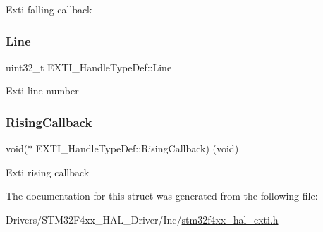 Exti falling callback \mbox{\label{struct_e_x_t_i___handle_type_def_a6a2875051ad4276be5322ffa99e12566}} 
\subsubsection{\texorpdfstring{Line}{Line}}
{\footnotesize\ttfamily uint32\+\_\+t E\+X\+T\+I\+\_\+\+Handle\+Type\+Def\+::\+Line}

Exti line number \mbox{\label{struct_e_x_t_i___handle_type_def_a9d74e688439641a4d68d2730a61b149f}} 
\subsubsection{\texorpdfstring{Rising\+Callback}{RisingCallback}}
{\footnotesize\ttfamily void($\ast$  E\+X\+T\+I\+\_\+\+Handle\+Type\+Def\+::\+Rising\+Callback) (void)}

Exti rising callback 

The documentation for this struct was generated from the following file\+:\begin{DoxyCompactItemize}
\item 
Drivers/\+S\+T\+M32\+F4xx\+\_\+\+H\+A\+L\+\_\+\+Driver/\+Inc/\hyperlink{stm32f4xx__hal__exti_8h}{stm32f4xx\+\_\+hal\+\_\+exti.\+h}\end{DoxyCompactItemize}
